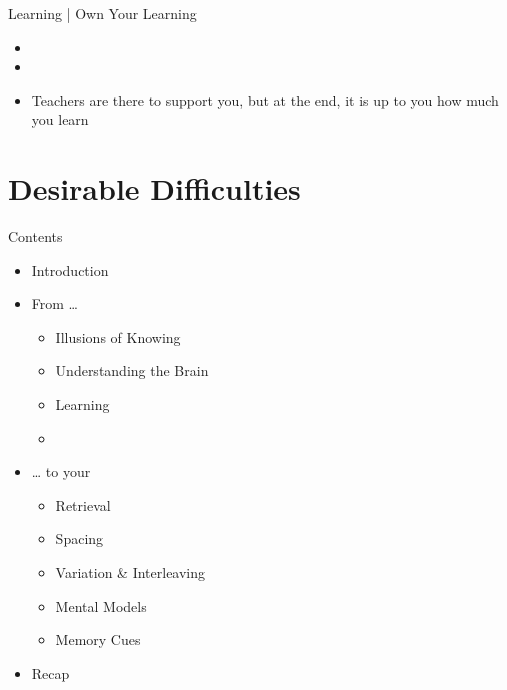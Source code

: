 \documentclass{ercisbeamer}
\begin{document}
\begin{frame}{Learning | Own Your Learning}
    \begin{tbox}
        \begin{itemize}
            \item {}
            \item {}
            \item Teachers are there to support you, but at the end, it is up to you how much you learn
        \end{itemize}
    \end{tbox}
\end{frame}
\setbgimage{}

\section{Desirable Difficulties}
\begin{frame}{Contents}
    \begin{itemize}
        \item Introduction
        \item From …
        \begin{itemize}
            \item Illusions of Knowing
            \item Understanding the Brain
            \item Learning
            \item {}
        \end{itemize}
        \item … to your 
        \begin{itemize}
            \item Retrieval
            \item Spacing
            \item Variation \& Interleaving
            \item Mental Models
            \item Memory Cues
        \end{itemize}
        \item Recap
    \end{itemize}
\end{frame}
\end{document}
